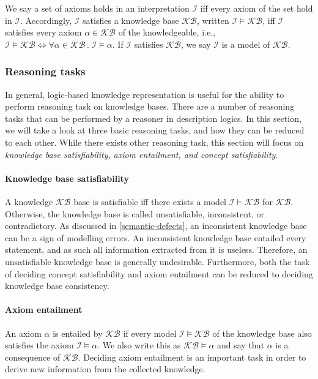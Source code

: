We say a set of axioms holds in an interpretation $\mathcal{I}$ iff every axiom of the set hold in $\mathcal{I}$. Accordingly, $\mathcal{I}$ satisfies a knowledge base $\mathcal{KB}$, written $\mathcal{I} \vDash \mathcal{KB}$, iff $\mathcal{I}$ satisfies every axiom $\alpha \in \mathcal{KB}$ of the knowledgeable, i.e., $\mathcal{I} \vDash \mathcal{KB} \iff \forall \alpha \in \mathcal{KB} \, . \; \mathcal{I} \vDash \alpha$. If $\mathcal{I}$ satisfies $\mathcal{KB}$, we say $\mathcal{I}$ is a model of $\mathcal{KB}$.

\subsubsection{Reasoning tasks}

In general, logic-based knowledge representation is useful for the ability to perform reasoning task on knowledge bases. There are a number of reasoning tasks that can be performed by a reasoner in description logics. In this section, we will take a look at three basic reasoning tasks, and how they can be reduced to each other. While there exists other reasoning task, this section will focus on \emph{knowledge base satisfiability,} \emph{axiom entailment, and concept satisfiability}.

\paragraph{Knowledge base satisfiability}

A knowledge $\mathcal{KB}$ base is satisfiable iff there exists a model $\mathcal{I} \vDash \mathcal{KB}$ for $\mathcal{KB}$. Otherwise, the knowledge base is called unsatisfiable, inconsistent, or contradictory. As discussed in \cref{semantic-defects}, an inconsistent knowledge base can be a sign of modelling errors. An inconsistent knowledge base entailed every statement, and as such all information extracted from it is useless. Therefore, an unsatisfiable knowledge base is generally undesirable. Furthermore, both the task of deciding concept satisfiability and axiom entailment can be reduced to deciding knowledge base consistency.

\paragraph{Axiom entailment}

An axiom $\alpha$ is entailed by $\mathcal{KB}$ if every model $\mathcal{I} \vDash \mathcal{KB}$ of the knowledge base also satisfies the axiom $\mathcal{I} \vDash \alpha$. We also write this as $\mathcal{KB} \vDash \alpha$ and say that $\alpha$ is a consequence of $\mathcal{KB}$. Deciding axiom entailment is an important task in order to derive new information from the collected knowledge.

